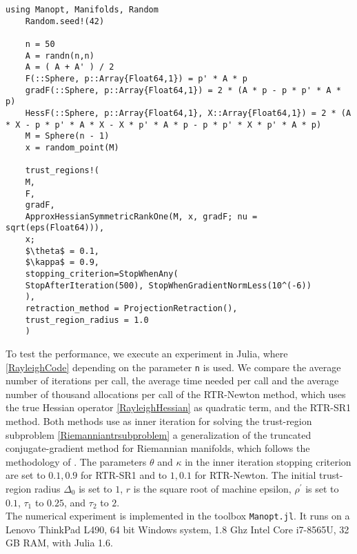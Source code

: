 \begin{lstlisting}[mathescape, caption={The Rayleigh quotient minimization experiment in Julia for $n = 500$.}, label={RayleighCode}]
    using Manopt, Manifolds, Random
    Random.seed!(42)

    n = 50
    A = randn(n,n)
    A = ( A + A' ) / 2
    F(::Sphere, p::Array{Float64,1}) = p' * A * p
    gradF(::Sphere, p::Array{Float64,1}) = 2 * (A * p - p * p' * A * p)
    HessF(::Sphere, p::Array{Float64,1}, X::Array{Float64,1}) = 2 * (A * X - p * p' * A * X - X * p' * A * p - p * p' * X * p' * A * p)
    M = Sphere(n - 1)
    x = random_point(M)

    trust_regions!(
    M,
    F,
    gradF,
    ApproxHessianSymmetricRankOne(M, x, gradF; nu = sqrt(eps(Float64))),
    x;
    $\theta$ = 0.1,
    $\kappa$ = 0.9,
    stopping_criterion=StopWhenAny(
    StopAfterIteration(500), StopWhenGradientNormLess(10^(-6))
    ),
    retraction_method = ProjectionRetraction(),
    trust_region_radius = 1.0
    )
\end{lstlisting}
To test the performance, we execute an experiment in Julia, where \cref{RayleighCode} depending on the parameter \lstinline!n! is used. We compare the average number of iterations per call, the average time needed per call and the average number of thousand allocations per call of the RTR-Newton method, which uses the true Hessian operator \cref{RayleighHessian} as quadratic term, and the RTR-SR1 method. Both methods use as inner iteration for solving the trust-region subproblem \cref{Riemanniantrsubproblem} a generalization of the truncated conjugate-gradient method for Riemannian manifolds, which follows the methodology of \cite[Algorithm~11]{AbsilMahonySepulchre:2008}. The parameters $\theta$ and $\kappa$ in the inner iteration stopping criterion \cite[(7.10)]{AbsilMahonySepulchre:2008} are set to $0.1, 0.9$ for RTR-SR1 and to $1, 0.1$ for RTR-Newton. The initial trust-region radius $\Delta_0$ is set to $1$, $r$ is the square root of machine epsilon, $\rho^{\prime}$ is set to $0.1$, $\tau_1$ to $0.25$, and $\tau_2$ to $2$. \\
The numerical experiment is implemented in the toolbox \lstinline!Manopt.jl!. It runs on a Lenovo ThinkPad L490, 64 bit Windows system, 1.8 Ghz Intel Core i7-8565U, 32 GB RAM, with Julia 1.6.

